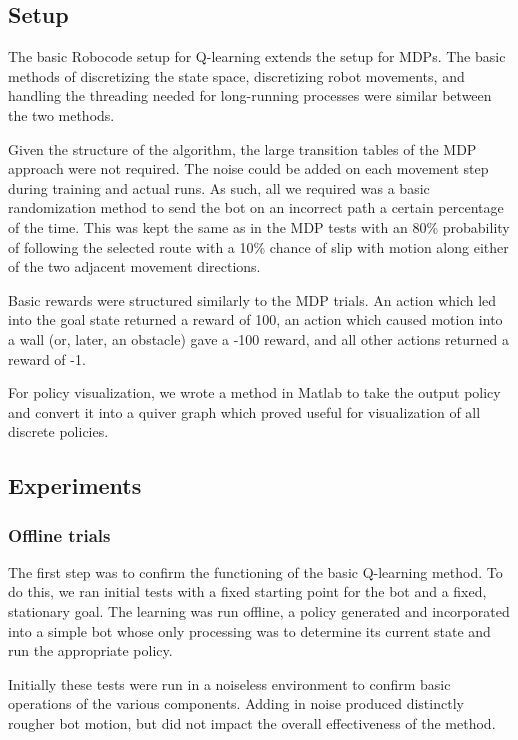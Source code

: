 \documentclass{aiaa-tc}%
\begin{document}
\subsection{Setup}

The basic Robocode setup for Q-learning extends
the setup for MDPs. The basic methods of discretizing the state
space, discretizing robot movements, and handling the threading needed
for long-running processes were similar between the two methods.

Given the structure of the algorithm, the large transition tables of
the MDP approach were not required. The noise could be added on each movement
step during training and actual runs. As such, all we required was a
basic randomization method to send the bot on an incorrect path a
certain percentage of the time. This was kept the same as in the MDP
tests with an 80\% probability of following the selected route with a
10\% chance of slip with motion along either of the two adjacent
movement directions.

Basic rewards were structured similarly to the MDP trials. An action
which led into the goal state returned a reward of 100, an action
which caused motion into a
wall (or, later, an obstacle) gave a -100 reward, and all other
actions returned a reward of -1.

For policy visualization, we wrote a method in Matlab to take the output
policy and convert it into a quiver graph which proved useful for
visualization of all discrete policies.

\subsection{Experiments}

\subsubsection{Offline trials}
The first step was to confirm the functioning of the basic
Q-learning method. To do this, we ran initial tests with a fixed
starting point for the bot and a fixed, stationary
goal. The learning was run offline, a policy generated and
incorporated into a simple bot whose only processing was to determine
its current state and run the appropriate policy.

Initially these tests were run in a noiseless environment to
confirm basic operations of the various components. Adding in noise
produced distinctly rougher bot motion, but did not impact the overall
effectiveness of the method.
\end{document}
